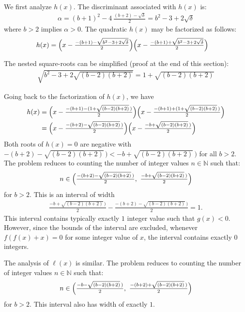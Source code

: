 We first analyze $h(x)$. The discriminant associated with $h(x)$ is: 
\begin{align*}
\alpha 
  = (b+1)^{2} -4 \ \tfrac{(b+2) - \sqrt{\delta}}{2}
  = b^{2}-3+2\sqrt{\delta}
\end{align*}
where $b>2$ implies $\alpha>0$. The quadratic $h(x)$ may be factorized as follows:
\begin{align*}
h(x) 
& = \Bigl(x-\tfrac{-(b+1)-\sqrt{b^{2}-3+2\sqrt{\delta}}}{2}\Bigr)
    \Bigl(x-\tfrac{-(b+1)+\sqrt{b^{2}-3+2\sqrt{\delta}}}{2}\Bigr)
\end{align*}

The nested square-roots can be simplified (proof at the end of this section):
\begin{align*}
\sqrt{b^{2}-3+2\sqrt{(b-2)(b+2)}}
= 1 + \sqrt{(b-2)(b+2)}
\end{align*}

Going back to the factorization of $h(x)$, we have
\begin{align*}
h(x) 
& = \Bigl(x-\tfrac{-(b+1)-(1+\sqrt{(b-2)(b+2)}\,)}{2}\Bigr)
    \Bigl(x-\tfrac{-(b+1)+(1+\sqrt{(b-2)(b+2)}\,)}{2}\Bigr)
\\
& = \Bigl(x-\tfrac{-(b+2)-\sqrt{(b-2)(b+2)}\,)}{2}\Bigr)
    \Bigl(x-\tfrac{-b+\sqrt{(b-2)(b+2)}\,)}{2}\Bigr)
\end{align*}
Both roots of $h(x)=0$ are negative with $-(b+2)-\sqrt{(b-2)(b+2)}\,)<-b+\sqrt{(b-2)(b+2)}\,)$ for all $b>2$.
The problem reduces to counting the number of integer values $n\in\mathbb{N}$ such that:
\begin{align*}
n \in \Bigl(\tfrac{-(b+2)-\sqrt{(b-2)(b+2)}\,)}{2},\
            \tfrac{-b+\sqrt{(b-2)(b+2)}\,)}{2}
      \Bigr)
\end{align*}
for $b>2$. This is an interval of width
\begin{align*}
\tfrac{-b+\sqrt{(b-2)(b+2)}\,)}{2}-\tfrac{-(b+2)-\sqrt{(b-2)(b+2)}\,)}{2}=1.
\end{align*}
This interval contains typically exactly $1$ integer value such that $g(x)<0$. However, since the bounds of the interval are excluded, whenever $f(f(x)+x)=0$ for some integer value of $x$, the interval contains exactly $0$ integers. 

The analysis of $\ell(x)$ is similar. 
The problem reduces to counting the number of integer values $n\in\mathbb{N}$ such that:
\begin{align*}
n \in \Bigl(\tfrac{-b-\sqrt{(b-2)(b+2)}\,)}{2},\
            \tfrac{-(b+2)+\sqrt{(b-2)(b+2)}\,)}{2}
      \Bigr)
\end{align*}
for $b>2$. This interval also has width of exactly $1$.

